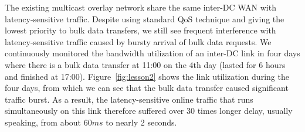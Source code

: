 The existing multicast overlay network share the same inter-DC WAN
with latency-sensitive traffic.
Despite using standard QoS technique and giving the lowest priority to
bulk data transfers, we still see frequent interference with
latency-sensitive traffic caused by bursty arrival of bulk data
requests.
We continuously monitored the bandwidth utilization of an inter-DC
link in four days where there is a bulk data transfer at 11:00 on the
4th day (lasted for 6 hours and finished at 17:00).
Figure~\ref{fig:lesson2} shows the link utilization during the four
days, from which we can see that the bulk data transfer caused
significant traffic burst. As a result, the latency-sensitive online
traffic that runs simultaneously on this link therefore suffered over
30 times longer delay, usually speaking,
from about $60ms$ to nearly 2 seconds.



